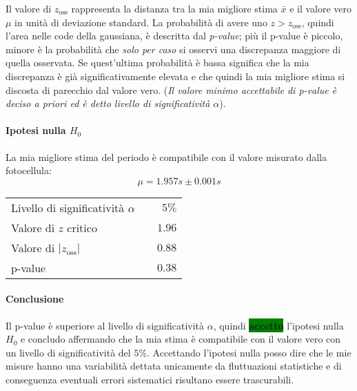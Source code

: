 \documentclass{article}
\begin{document}
	
	\noindent
	Il valore di $z_{\text{oss}}$ rappresenta la distanza tra la mia migliore stima $\bar{x}$ e il valore vero $\mu$ in unità di deviazione standard. La probabilità di avere uno $z > z_{\text{oss}}$, quindi l'area nelle code della gaussiana, è descritta dal \textit{p-value}; più il p-value è piccolo, minore è la probabilità che \textit{solo per caso} si osservi una discrepanza maggiore di quella osservata. Se quest'ultima probabilità è bassa significa che la mia discrepanza è già significativamente elevata e che quindi la mia migliore stima si discosta di parecchio dal valore vero.
	(\textit{Il valore minimo accettabile di p-value è deciso a priori ed è detto livello di significatività $\alpha$}).
	
	\paragraph{Ipotesi nulla $H_{0}$} La mia migliore stima del periodo è compatibile con il valore misurato dalla fotocellula:
	\[
	\mu = 1.957s \pm 0.001 s
	\]
	
	\begin{table}[H]
		\centering
		\begin{tabular}{lr}
			Livello di significatività $\alpha$		& $ \quad 5\%$  \\
			Valore di $z$ critico     & $\quad 1.96$ \\
			Valore di $|z_{\text{oss}}|$      & $\quad 0.88$ \\
			p-value     & $\quad 0.38$
		\end{tabular}
	\end{table}



	\paragraph{Conclusione}\label{para}  Il p-value è superiore al livello di significatività $\alpha$, quindi \colorbox{green}{\textbf{accetto}} l'ipotesi nulla $H_{0}$ e concludo affermando che la mia stima è compatibile con il valore vero con un livello di significatività del $5\%$. Accettando l'ipotesi nulla posso dire che le mie misure hanno una variabilità dettata unicamente da fluttuazioni statistiche e di conseguenza eventuali  errori sistematici risultano essere trascurabili.
	
\end{document}
